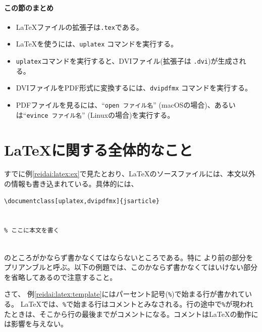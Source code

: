 \paragraph{この節のまとめ}

\begin{itemize}
    \item \LaTeX ファイルの拡張子は\texttt{.tex}である。
    \item \LaTeX を使うには、\texttt{uplatex} コマンドを実行する。
    \item \texttt{uplatex}コマンドを実行すると、DVIファイル(拡張子は \texttt{.dvi})が生成される。
    \item DVIファイルをPDF形式に変換するには、\texttt{dvipdfmx} コマンドを実行する。
    \item PDFファイルを見るには、``\texttt{open ファイル名}'' (macOSの場合)、あるいは``\texttt{evince ファイル名}'' (Linuxの場合)を実行する。
\end{itemize}

\section{\LaTeX に関する全体的なこと}
\label{sec:latex:global}

すでに例\ref{reidai:latex:ex}で見たとおり、\LaTeX のソースファイルには、本文以外の情報も書き込まれている。具体的には、
\begin{reidai}
    \label{reidai:latex:template}
    \begin{verbatim}
\documentclass[uplatex,dvipdfmx]{jsarticle}


% ここに本文を書く


\end{verbatim}
\end{reidai} \noindent
のところがかならず書かなくてはならないところである。特に \verb||より前の部分をプリアンブルと呼ぶ。以下の例題では、このかならず書かなくてはいけない部分を省略してあるので注意すること。

さて、 例\ref{reidai:latex:template}にはパーセント記号(\texttt{\%})で始まる行が書かれている。 \LaTeX では、\texttt{\%}で始まる行はコメントとみなされる。行の途中で\texttt{\%}が現われたときは、そこから行の最後までがコメントになる。コメントは\LaTeX の動作には影響を与えない。

